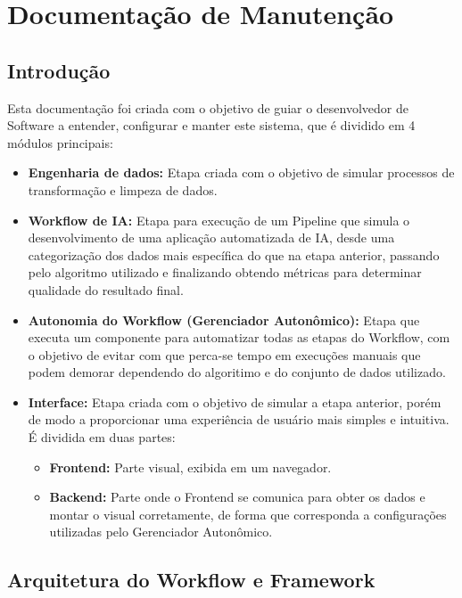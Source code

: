 \documentclass[Portugues,Final]{ic-tese-v3}
\begin{document}
\chapter{Documentação de Manutenção}
\label{ann:DocMain}

\section{Introdução}

Esta documentação foi criada com o objetivo de guiar o desenvolvedor de Software a entender, configurar e manter este sistema, que é dividido em 4 módulos principais:

\begin{itemize}
    \item {\textbf{Engenharia de dados:}} Etapa criada com o objetivo de simular processos de transformação e limpeza de dados.
    \item {\textbf{Workflow de IA:}} Etapa para execução de um Pipeline que simula o desenvolvimento de uma aplicação automatizada de IA, desde uma categorização dos dados mais específica do que na etapa anterior, passando pelo algoritmo utilizado e finalizando obtendo métricas para determinar qualidade do resultado final.
    \item {\textbf{Autonomia do Workflow (Gerenciador Autonômico):}} Etapa que executa um componente para automatizar todas as etapas do Workflow, com o objetivo de evitar com que perca-se tempo em execuções manuais que podem demorar dependendo do algoritimo e do conjunto de dados utilizado.
    \item {\textbf{Interface:}} Etapa criada com o objetivo de simular a etapa anterior, porém de modo a proporcionar uma experiência de usuário mais simples e intuitiva. É dividida em duas partes:
    \begin{itemize}
        \item {\textbf{Frontend:}} Parte visual, exibida em um navegador.
        \item \textbf{{Backend:}} Parte onde o Frontend se comunica para obter os dados e montar o visual corretamente, de forma que corresponda a configurações utilizadas pelo Gerenciador Autonômico.
    \end{itemize}
\end{itemize}

\section{Arquitetura do Workflow e Framework}
\end{document}
